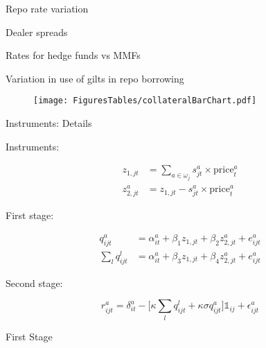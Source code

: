 \documentclass{beamer}
\begin{document}


\begin{frame}{Repo rate variation}

\end{frame}


\begin{frame}{Dealer spreads}\label{frame:dealerSpreads}

\end{frame}

\begin{frame}{Rates for hedge funds vs MMFs}\label{frame:rateHFMMF}


\hyperlink{frame:fact3}{}  
\end{frame}



\begin{frame}{Variation in use of gilts in repo borrowing}\label{frame:giltVariation}
\begin{figure}
\centering
\texttt{[image: FiguresTables/collateralBarChart.pdf]}
\end{figure}
\hyperlink{frame:instruments}{}   \hyperlink{frame:instFacts}{}  
\end{frame}


\begin{frame}{Instruments: Details}\label{frame:instrumentDetails}

Instruments:

\vspace{-10pt}

\begin{align*}
    z_{1,jt}&=\sum_{a \in \omega_j}s_{jt}^a \times\text{price}^a_{t}\\
z^a_{2,jt}&= z_{1,jt}-s_{jt}^a\times\text{price}^a_{t}
\end{align*}

First stage:

\vspace{-10pt}

\begin{align*}
    q^a_{ijt}&=\alpha^a_{it}+\beta_1 z_{1,jt}+\beta_2 z^a_{2,jt}+e^a_{ijt}\\
    \sum_l q^l_{ijt}&=\alpha^a_{it}+\beta_3 z_{1,jt}+\beta_4 z^a_{2,jt}+e^a_{ijt}
\end{align*}

Second stage:

\vspace{-10pt}

\begin{equation*}
    r^a_{ijt}=\delta^a_{it}-\bigg[ \kappa \sum_l q^l_{ijt}+\kappa \sigma q^a_{ijt} \bigg] \mathds{1}_{ij}+\epsilon^a_{ijt}
\end{equation*}

\vspace{-10pt}

\hyperlink{frame:instruments}{}    

\end{frame}

\begin{frame}{First Stage}\label{frame:results}

 \hyperlink{frame:results}{}    
\end{frame}
\end{document}
